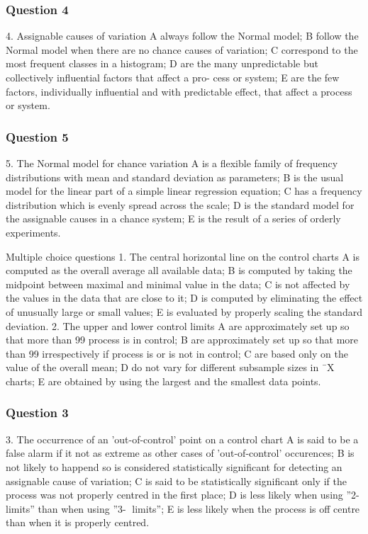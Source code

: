 \subsubsection*{Question 4}
4. Assignable causes of variation
A always follow the Normal model;
B follow the Normal model when there are no chance causes of variation;
C correspond to the most frequent classes in a histogram;
D are the many unpredictable but collectively influential factors that affect a pro-
cess or system;
E are the few factors, individually influential and with predictable effect, that affect
a process or system.

\subsubsection*{Question 5}
5. The Normal model for chance variation
A is a flexible family of frequency distributions with mean and standard deviation
as parameters;
B is the usual model for the linear part of a simple linear regression equation;
C has a frequency distribution which is evenly spread across the scale;
D is the standard model for the assignable causes in a chance system;
E is the result of a series of orderly experiments.



Multiple choice questions
1. The central horizontal line on the control charts
A is computed as the overall average all available data;
B is computed by taking the midpoint between maximal and minimal value in the
data;
C is not affected by the values in the data that are close to it;
D is computed by eliminating the effect of unusually large or small values;
E is evaluated by properly scaling the standard deviation.
2. The upper and lower control limits
A are approximately set up so that more than 99%
process is in control;
B are approximately set up so that more than 99%
irrespectively if process is or is not in control;
C are based only on the value of the overall mean;
D do not vary for different subsample sizes in ¯X charts;
E are obtained by using the largest and the smallest data points.
\subsubsection*{Question 3}
3. The occurrence of an ’out-of-control’ point on a control chart
A is said to be a false alarm if it not as extreme as other cases of ’out-of-control’
occurences;
B is not likely to happend so is considered statistically significant for detecting an
assignable cause of variation;
C is said to be statistically significant only if the process was not properly centred
in the first place;
D is less likely when using ”2- limits” than when using ”3- limits”;
E is less likely when the process is off centre than when it is properly centred.


